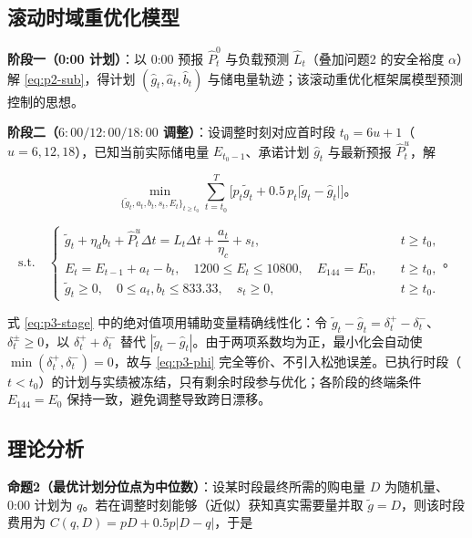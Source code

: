 \subsection{滚动时域重优化模型}

\textbf{阶段一（0:00 计划）}：以 0:00 预报 $\hat P^{0}_t$ 与负载预测 $\hat L_t$（叠加问题2 的安全裕度 $\alpha$）解 \cref{eq:p2-sub}，得计划 $(\hat g_t,\hat a_t,\hat b_t)$ 与储电量轨迹；该滚动重优化框架属模型预测控制的思想\cite{mayne2000}。

\textbf{阶段二（$6{:}00/12{:}00/18{:}00$ 调整）}：设调整时刻对应首时段 $t_0=6u+1$（$u=6,12,18$），已知当前实际储电量 $E_{t_0-1}$、承诺计划 $\hat g_t$ 与最新预报 $\hat P^{u}_t$，解

\begin{equation}
  \min_{\{\tilde g_t,a_t,b_t,s_t,E_t\}_{t\ge t_0}}
  \sum_{t=t_0}^{T}\Big[p_t\tilde g_t+0.5\,p_t\big|\tilde g_t-\hat g_t\big|\Big]\text{。}
  \label{eq:p3-stage}
\end{equation}

\begin{equation}
  \text{s.t.}\quad
  \begin{cases}
    \tilde g_t+\eta_db_t+\hat P^{u}_t\Delta t=L_t\Delta t+\dfrac{a_t}{\eta_c}+s_t,&\quad t\ge t_0,\\[4pt]
    E_t=E_{t-1}+a_t-b_t,\quad1200\le E_t\le10800,\quad E_{144}=E_0,&\quad t\ge t_0,\\[4pt]
    \tilde g_t\ge0,\quad0\le a_t,b_t\le833.33,\quad s_t\ge0,&\quad t\ge t_0 .
  \end{cases}\text{。}
  \label{eq:p3-cons}
\end{equation}

式 \eqref{eq:p3-stage} 中的绝对值项用辅助变量精确线性化：令 $\tilde g_t-\hat g_t=\delta_t^{+}-\delta_t^{-}$、$\delta_t^{\pm}\ge0$，以 $\delta_t^{+}+\delta_t^{-}$ 替代 $|\tilde g_t-\hat g_t|$。由于两项系数均为正，最小化会自动使 $\min(\delta_t^{+},\delta_t^{-})=0$，故与 \eqref{eq:p3-phi} 完全等价、不引入松弛误差。已执行时段（$t<t_0$）的计划与实绩被冻结，只有剩余时段参与优化；各阶段的终端条件 $E_{144}=E_0$ 保持一致，避免调整导致跨日漂移。

\subsection{理论分析}

\textbf{命题2（最优计划分位点为中位数）}：设某时段最终所需的购电量 $D$ 为随机量、0:00 计划为 $q$。若在调整时刻能够（近似）获知真实需要量并取 $\tilde g=D$，则该时段费用为 $C(q,D)=pD+0.5p|D-q|$，于是

